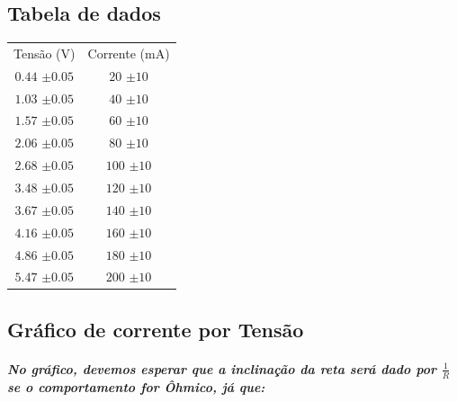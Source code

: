 \documentclass[12pt,twoside, a4paper, twocolumn]{article}
\begin{document}
\subsection{Tabela de dados}
\begin{center}
    \begin{tabular}{ |cc| }
        \hline
        Tensão (V)        & Corrente (mA)     \\
        $0.44$ $\pm0.05$  & $20$ $\pm10$      \\
        $1.03$ $\pm0.05$  & $40$     $\pm10$  \\
        $1.57$ $\pm0.05$  & $60$     $\pm10$  \\
        $2.06$ $\pm0.05$  & $80$      $\pm10$ \\
        $2.68$ $\pm0.05$  & $100$     $\pm10$ \\
        $3.48$ $\pm0.05$  & $120$     $\pm10$ \\
        $3.67$  $\pm0.05$ & $140$     $\pm10$ \\
        $4.16$ $\pm0.05$  & $160$     $\pm10$ \\
        $4.86$ $\pm0.05$  & $180$     $\pm10$ \\
        $5.47$ $\pm0.05$  & $200$     $\pm10$ \\

        \hline
    \end{tabular}
\end{center}



\subsection{Gráfico de corrente por Tensão }
\subparagraph*{No gráfico, devemos esperar que a inclinação da reta será dado por $\frac{1}{R}$ se o comportamento for Ôhmico, já que: }
\end{document}
